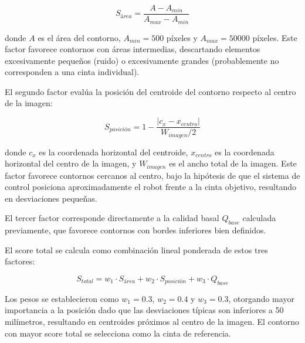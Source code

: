 \begin{equation}
S_{área} = \frac{A - A_{min}}{A_{max} - A_{min}}
\end{equation}

donde $A$ es el área del contorno, $A_{min} = 500$ píxeles y $A_{max} = 50000$ píxeles. Este factor favorece contornos con áreas intermedias, descartando elementos excesivamente pequeños (ruido) o excesivamente grandes (probablemente no corresponden a una cinta individual).

El segundo factor evalúa la posición del centroide del contorno respecto al centro de la imagen:

\begin{equation}
S_{posición} = 1 - \frac{|c_x - x_{centro}|}{W_{imagen}/2}
\end{equation}

donde $c_x$ es la coordenada horizontal del centroide, $x_{centro}$ es la coordenada horizontal del centro de la imagen, y $W_{imagen}$ es el ancho total de la imagen. Este factor favorece contornos cercanos al centro, bajo la hipótesis de que el sistema de control posiciona aproximadamente el robot frente a la cinta objetivo, resultando en desviaciones pequeñas.

El tercer factor corresponde directamente a la calidad basal $Q_{base}$ calculada previamente, que favorece contornos con bordes inferiores bien definidos.

El score total se calcula como combinación lineal ponderada de estos tres factores:

\begin{equation}
S_{total} = w_1 \cdot S_{área} + w_2 \cdot S_{posición} + w_3 \cdot Q_{base}
\end{equation}

Los pesos se establecieron como $w_1 = 0.3$, $w_2 = 0.4$ y $w_3 = 0.3$, otorgando mayor importancia a la posición dado que las desviaciones típicas son inferiores a 50 milímetros, resultando en centroides próximos al centro de la imagen. El contorno con mayor score total se selecciona como la cinta de referencia.

